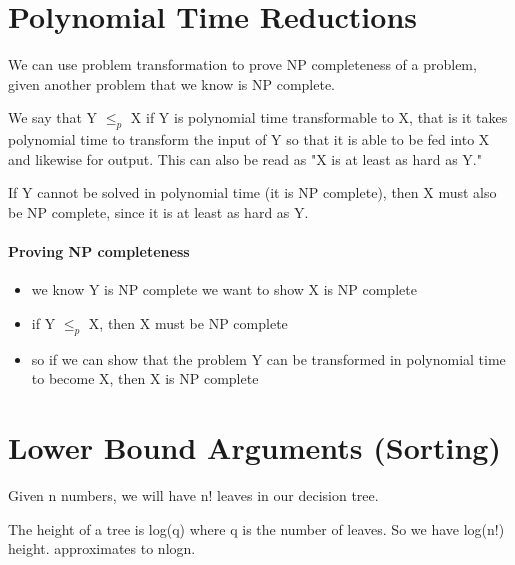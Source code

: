 \section{Polynomial Time Reductions}
We can use problem transformation to prove NP completeness of a problem, given another problem that we know is NP complete.
 
We say that Y $\leq_p$ X if Y is polynomial time transformable to X, that is it takes polynomial time to transform the input of Y so that it is able to be fed into X and likewise for output. This can also be read as "X is at least as hard as Y."
 
If Y cannot be solved in polynomial time (it is NP complete), then X must also be NP complete, since it is at least as hard as Y.

\paragraph{Proving NP completeness}
\begin{itemize}
    \item we know Y is NP complete
    we want to show X is NP complete
    \item if Y $\leq_p$ X, then X must be NP complete
    \item so if we can show that the problem Y can be transformed in polynomial time to become X, then X is NP complete
    
\end{itemize}


\section{Lower Bound Arguments (Sorting)}

Given n numbers, we will have n! leaves in our decision tree.
 
The height of a tree is log(q) where q is the number of leaves.
So we have log(n!) height. approximates to nlogn.


